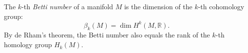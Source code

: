 The $k$-th \textit{Betti number} of a manifold $M$ is the dimension of the $k$-th cohomology group:
$$\beta_k(M) = \dim H^k(M, \mathbb{R}).$$
By de Rham's theorem, the Betti number also equals the rank of the $k$-th homology group $H_k(M)$.
